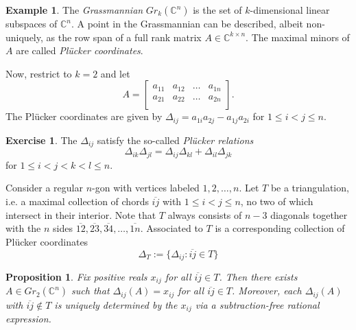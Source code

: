\documentclass{amsart}
\newtheorem{subproposition}{Proposition}[theorem]
\theoremstyle{definition}
\newtheorem{example}[theorem]{Example}
\newtheorem{subexercise}{Exercise}[theorem]
\theoremstyle{remark}
\numberwithin{equation}{section}
\newcommand{\CC}{{\mathbb{C}}}
\begin{document}
  \begin{example} \label{example:Gr2n}
		The \emph{Grassmannian} $Gr_{k}(\CC^n)$ is the set of $k$-dimensional linear subspaces of $\CC^n$.  A point in the Grassmannian can be described, albeit non-uniquely, as the row span of a full rank matrix $A \in \CC^{k \times n}$.  The maximal minors of $A$ are called \emph{Pl\"ucker coordinates}.
		
		Now, restrict to $k=2$ and let 
		\begin{displaymath}
			A = \left[ \begin{array}{cccc}
			a_{11} & a_{12} & \ldots & a_{1n} \\
			a_{21} & a_{22} & \ldots & a_{2n} \\
			\end{array} \right].
		\end{displaymath}
		The Pl\"ucker coordinates are given by $\Delta_{ij} = a_{1i}a_{2j} - a_{1j}a_{2i}$ for $1 \leq i < j \leq n$.  
		
		\begin{subexercise}
			The $\Delta_{ij}$ satisfy the so-called \emph{Pl\"ucker relations}
			\begin{displaymath}
				\Delta_{ik}\Delta_{jl} = \Delta_{ij}\Delta_{kl} + \Delta_{il}\Delta_{jk}
			\end{displaymath}
			for $1 \leq i < j < k < l \leq n$.
		\end{subexercise}
		
		Consider a regular $n$-gon with vertices labeled $1,2,\ldots, n$.  Let $T$ be a triangulation, i.e. a maximal collection of chords $\overline{ij}$ with $1 \leq i < j \leq n$, no two of which intersect in their interior.  Note that $T$ always consists of $n-3$ diagonals together with the $n$ sides $\overline{12}, \overline{23}, \overline{34}, \ldots, \overline{1n}$.  Associated to $T$ is a corresponding collection of Pl\"ucker coordinates
		\begin{displaymath}
			\Delta_T := \{\Delta_{ij} : \overline{ij} \in T\}
		\end{displaymath}
    \setcounter{subproposition}{1}
		\begin{subproposition}
		Fix positive reals $x_{ij}$ for all $\overline{ij} \in T$.  Then there exists $A \in Gr_2(\CC^n)$ such that $\Delta_{ij}(A) = x_{ij}$ for all $\overline{ij} \in T$.  Moreover, each $\Delta_{ij}(A)$ with $\overline{ij} \notin T$ is uniquely determined by the $x_{ij}$ via a subtraction-free rational expression.
		\end{subproposition}
		

\end{example}
\end{document}
